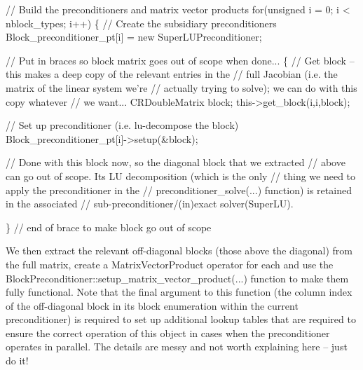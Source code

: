\begin{DoxyCodeInclude}

  \textcolor{comment}{// Build the preconditioners and matrix vector products}
  \textcolor{keywordflow}{for}(\textcolor{keywordtype}{unsigned} i = 0; i < nblock\_types; i++)
   \{
    \textcolor{comment}{// Create the subsidiary preconditioners}
    Block\_preconditioner\_pt[i] = \textcolor{keyword}{new} SuperLUPreconditioner;
    
    \textcolor{comment}{// Put in braces so block matrix goes out of scope when done...}
    \{
     \textcolor{comment}{// Get block -- this makes a deep copy of the relevant entries in the}
     \textcolor{comment}{// full Jacobian (i.e. the matrix of the linear system we're}
     \textcolor{comment}{// actually trying to solve); we can do with this copy whatever}
     \textcolor{comment}{// we want...}
     CRDoubleMatrix block;
     this->get\_block(i,i,block);
     
     \textcolor{comment}{// Set up preconditioner (i.e. lu-decompose the block)}
     Block\_preconditioner\_pt[i]->setup(&block);
     
     \textcolor{comment}{// Done with this block now, so the diagonal block that we extracted}
     \textcolor{comment}{// above can go out of scope. Its LU decomposition (which is the only }
     \textcolor{comment}{// thing we need to apply the preconditioner in the }
     \textcolor{comment}{// preconditioner\_solve(...) function) is retained in the associated }
     \textcolor{comment}{// sub-preconditioner/(in)exact solver(SuperLU).}

    \} \textcolor{comment}{// end of brace to make block go out of scope}

\end{DoxyCodeInclude}


We then extract the relevant off-\/diagonal blocks (those above the diagonal) from the full matrix, create a {\ttfamily Matrix\+Vector\+Product} operator for each and use the {\ttfamily Block\+Preconditioner\+::setup\+\_\+matrix\+\_\+vector\+\_\+product}(...) function to make them fully functional. Note that the final argument to this function (the column index of the off-\/diagonal block in its block enumeration within the current preconditioner) is required to set up additional lookup tables that are required to ensure the correct operation of this object in cases when the preconditioner operates in parallel. The details are messy and not worth explaining here -- just do it!


